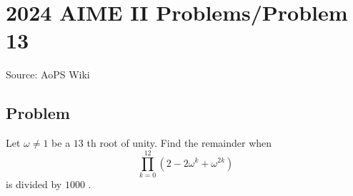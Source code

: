 \documentclass[12pt]{article}
\begin{document}
\section*{{2024 AIME II Problems/Problem 13}}
Source: AoPS Wiki

\subsection*{Problem}
Let $\omega\neq 1$ be a $13$ th root of unity. Find the remainder when \[\prod_{k=0}^{12}(2-2\omega^k+\omega^{2k})\] is divided by $1000$ .
\end{document}
